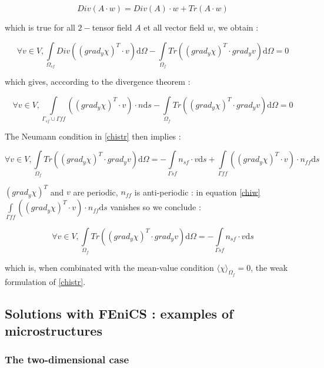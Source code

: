 \[Div(A\cdot w)=Div(A)\cdot w+Tr(A\cdot w)\]

which is true for all $2-$tensor field $A$ et all vector field $w$, we obtain :

\[\forall v \in V , \int\limits_{\Omega_{sf}}Div\left(\left(grad_y \chi\right)^{T}\cdot v\right)\text{d}\Omega-%
\int\limits_{\Omega_f}Tr\left(\left(grad_y\chi\right)^T\cdot grad_y v\right)\text{d}\Omega=0\]

which gives, acccording to the divergence theorem :

\[\forall v \in V , \int\limits_{\Gamma_{sf}\cup\Gamma{ff}}\left(\left(grad_y \chi\right)^{T}\cdot v\right)\cdot n\text{d}s-%
\int\limits_{\Omega_f}Tr\left(\left(grad_y\chi\right)^T\cdot grad_y v\right)\text{d}\Omega=0\]

The Neumann condition in \ref{chistr} then implies :

\begin{equation}\label{chiw}
\forall v \in V , %
\int\limits_{\Omega_f}Tr\left(\left(grad_y\chi\right)^T\cdot grad_y v\right)\text{d}\Omega=%
-\int\limits_{\Gamma{sf}}n_{sf}\cdot v\text{d}s%
+\int\limits_{\Gamma{ff}}\left(\left(grad_y \chi\right)^{T}\cdot v\right)\cdot n_{ff}\text{d}s
\end{equation}

$\left(grad_y \chi\right)^{T}$ and $v$ are periodic, $n_{ff}$ is anti-periodic : %
in equation \ref{chiw} $\displaystyle\int\limits_{\Gamma{ff}}\left(\left(grad_y \chi\right)^{T}\cdot v\right)\cdot n_{ff}\text{d}s$ vanishes so we conclude :

\begin{equation}\label{chiwper}
\forall v \in V , %
\int\limits_{\Omega_f}Tr\left(\left(grad_y\chi\right)^T\cdot grad_y v\right)\text{d}\Omega=%
-\int\limits_{\Gamma{sf}}n_{sf}\cdot v\text{d}s
\end{equation}

which is, when combinated with the mean-value condition $\langle\chi\rangle_{\Omega_f}=0$, the weak formulation of \ref{chistr}.

\subsection{Solutions with FEniCS : examples of microstructures}

\subsubsection{The two-dimensional case}





